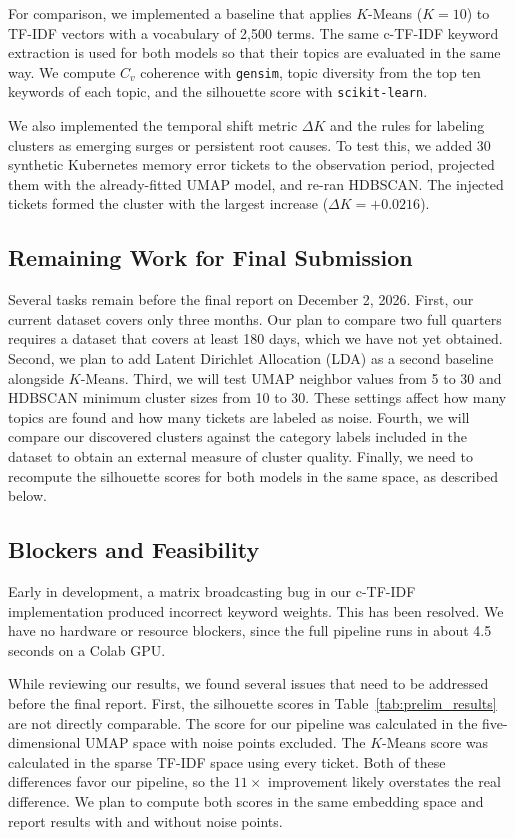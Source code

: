 \documentclass[sigconf,nonacm]{acmart}
\begin{document}
For comparison, we implemented a baseline that applies $K$-Means ($K = 10$) to TF-IDF vectors with a vocabulary of 2,500 terms. The same c-TF-IDF keyword extraction is used for both models so that their topics are evaluated in the same way. We compute $C_v$ coherence with \texttt{gensim}, topic diversity from the top ten keywords of each topic, and the silhouette score with \texttt{scikit-learn}.

We also implemented the temporal shift metric $\Delta K$ and the rules for labeling clusters as emerging surges or persistent root causes. To test this, we added 30 synthetic Kubernetes memory error tickets to the observation period, projected them with the already-fitted UMAP model, and re-ran HDBSCAN. The injected tickets formed the cluster with the largest increase ($\Delta K = +0.0216$).

\subsection{Remaining Work for Final Submission}
Several tasks remain before the final report on December 2, 2026. First, our current dataset covers only three months. Our plan to compare two full quarters requires a dataset that covers at least 180 days, which we have not yet obtained. Second, we plan to add Latent Dirichlet Allocation (LDA) as a second baseline alongside $K$-Means. Third, we will test UMAP neighbor values from 5 to 30 and HDBSCAN minimum cluster sizes from 10 to 30. These settings affect how many topics are found and how many tickets are labeled as noise. Fourth, we will compare our discovered clusters against the category labels included in the dataset to obtain an external measure of cluster quality. Finally, we need to recompute the silhouette scores for both models in the same space, as described below.

\subsection{Blockers and Feasibility}
Early in development, a matrix broadcasting bug in our c-TF-IDF implementation produced incorrect keyword weights. This has been resolved. We have no hardware or resource blockers, since the full pipeline runs in about 4.5 seconds on a Colab GPU.

While reviewing our results, we found several issues that need to be addressed before the final report. First, the silhouette scores in Table~\ref{tab:prelim_results} are not directly comparable. The score for our pipeline was calculated in the five-dimensional UMAP space with noise points excluded. The $K$-Means score was calculated in the sparse TF-IDF space using every ticket. Both of these differences favor our pipeline, so the $11\times$ improvement likely overstates the real difference. We plan to compute both scores in the same embedding space and report results with and without noise points.
\end{document}
